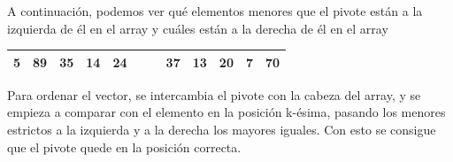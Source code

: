 \documentclass[10pt,a4paper,spanish]{report}
\theoremstyle{definition}
\theoremstyle{remark}
\begin{document}
A continuación, podemos ver qué elementos menores que el pivote están a la izquierda de él en el array y cuáles están a la derecha de él en el array

\begin{center}
\begin{tabular}{|c|c|c|c|c|c|c|c|c|c|c|}
\hline
\cellcolor{green}5 & \cellcolor{red}89 & \cellcolor{red}35 &\cellcolor{green} 14 &\cellcolor{red} 24 &\cellcolor{blue} \textcolor{white}{15}&\cellcolor{red} 37 &\cellcolor{green} 13 &\cellcolor{red} 20 &\cellcolor{green} 7 &\cellcolor{red} 70 \\
\hline
\end{tabular}
\end{center}

Para ordenar el vector, se intercambia el pivote con la cabeza del array, y se empieza a comparar con el elemento en la posición k-ésima, pasando los menores estrictos a la izquierda y a la derecha los mayores iguales. Con esto se consigue que el pivote quede en la posición correcta.
\end{document}
